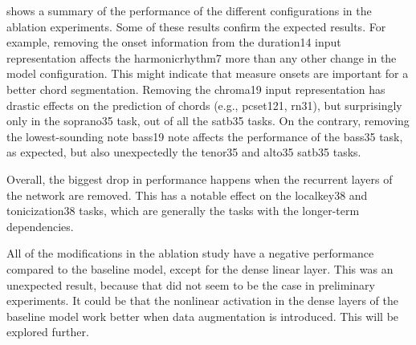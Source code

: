 

 shows a summary of the performance of the
different configurations in the ablation experiments. Some
of these results confirm the expected results. For example,
removing the onset information from the \gls{duration14}
input representation affects the \gls{harmonicrhythm7} more
than any other change in the model configuration. This might
indicate that measure onsets are important for a better
chord segmentation. Removing the \gls{chroma19} input
representation has drastic effects on the prediction of
chords (e.g., \gls{pcset121}, \gls{rn31}), but surprisingly
only in the \gls{soprano35} task, out of all the
\gls{satb35} tasks. On the contrary, removing the
lowest-sounding note \gls{bass19} note affects the
performance of the \gls{bass35} task, as expected, but also
unexpectedly the \gls{tenor35} and \gls{alto35} \gls{satb35}
tasks.

Overall, the biggest drop in performance happens when the
recurrent layers of the network are removed. This has a
notable effect on the \gls{localkey38} and
\gls{tonicization38} tasks, which are generally the tasks
with the longer-term dependencies. 

All of the modifications in the ablation study have a
negative performance compared to the baseline model, except
for the dense linear layer. This was an unexpected result,
because that did not seem to be the case in preliminary
experiments. It could be that the nonlinear activation in
the dense layers of the baseline model work better when data
augmentation is introduced. This will be explored further.
